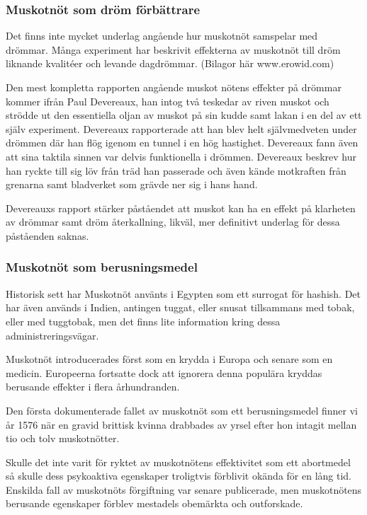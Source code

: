\subsubsection{Muskotnöt som dröm förbättrare}

Det finns inte mycket underlag angående hur muskotnöt samspelar med drömmar. Många experiment har beskrivit effekterna
av muskotnöt till dröm liknande kvalitéer och levande dagdrömmar. \cite{entheogenreview}
(Bilagor här www.erowid.com)

Den mest kompletta rapporten angående muskot nötens effekter på drömmar kommer ifrån Paul Devereaux, han intog
två teskedar av riven muskot och strödde ut den essentiella oljan av muskot på sin kudde samt lakan i en del
av ett själv experiment. Devereaux rapporterade att han blev helt självmedveten under drömmen där han flög igenom
en tunnel i en hög hastighet. Devereaux fann även att sina taktila sinnen var delvis funktionella i drömmen.
Devereaux beskrev hur han ryckte till sig löv från träd han passerade och även kände motkraften från grenarna samt
bladverket som grävde ner sig i hans hand. \cite{RudgleyR}

Devereauxs rapport stärker påståendet att muskot kan ha en effekt på klarheten av drömmar samt dröm återkallning,
likväl, mer definitivt underlag för dessa påståenden saknas.


\subsubsection{Muskotnöt som berusningsmedel}

Historisk sett har Muskotnöt använts i Egypten som ett surrogat för hashish. Det har även används i Indien, antingen
tuggat, eller snusat tillsammans med tobak, eller med tuggtobak, men det finns lite information kring dessa
administreringsvägar.

Muskotnöt introducerades först som en krydda i Europa och senare som en medicin. Europeerna
fortsatte dock att ignorera denna populära kryddas berusande effekter i flera århundranden.

Den första dokumenterade fallet av muskotnöt som ett berusningsmedel finner vi år 1576 när en
gravid brittisk kvinna drabbades av yrsel efter hon intagit mellan tio och tolv muskotnötter. \cite{stein2001nutmeg}

Skulle det inte varit för ryktet av muskotnötens effektivitet som ett abortmedel så skulle dess
psykoaktiva egenskaper troligtvis förblivit okända för en lång tid.
Enskilda fall av muskotnöts förgiftning var senare publicerade, men muskotnötens
berusande egenskaper förblev mestadels obemärkta och outforskade.

